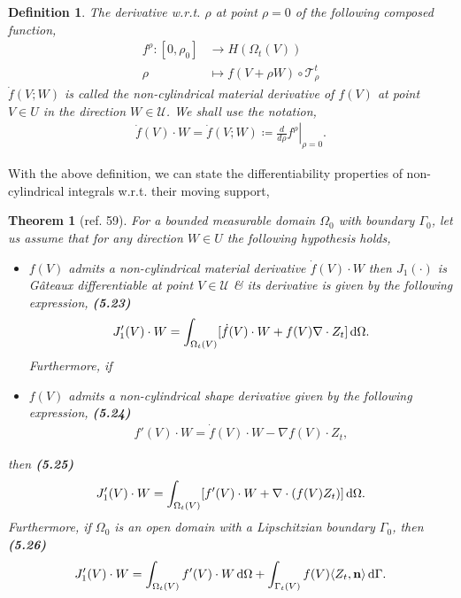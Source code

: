 \documentclass[oneside]{book}
\numberwithin{equation}{section}
\newtheorem{definition}{Definition}[chapter]
\newtheorem{theorem}{Theorem}[chapter]
\begin{document}
\begin{definition}
	The derivative w.r.t. $\rho$ at point $\rho = 0$ of the following composed function,
	\begin{align*}
		f^\rho:[0,\rho_0]&\to H(\Omega_t(V))\\
		\rho&\mapsto f(V + \rho W)\circ\mathcal{T}_\rho^t
	\end{align*}
	$\dot{f}(V;W)$ is called the \emph{non-cylindrical material derivative} of $f(V)$ at point $V\in U$ in the direction $W\in\mathcal{U}$. We shall use the notation,
	\begin{align*}
		\dot{f}(V)\cdot W = \dot{f}(V;W)\coloneqq\left.\frac{d}{d\rho}f^\rho\right|_{\rho = 0}.
	\end{align*}
\end{definition}
With the above definition, we can state the differentiability properties of non-cylindrical integrals w.r.t. their moving support,

\begin{theorem}[ref. 59]
	For a bounded measurable domain $\Omega_0$ with boundary $\Gamma_0$, let us assume that for any direction $W\in U$ the following hypothesis holds,
	\begin{itemize}
		\item[(i)] $f(V)$ admits a non-cylindrical material derivative $\dot{f}(V)\cdot W$ then $J_1(\cdot)$ is G\^ateaux differentiable at point $V\in\mathcal{U}$ \& its derivative is given by the following expression, \textbf{(5.23)}
		\begin{align*}
			J_1'(V)\cdot W = \int_{\Omega_t(V)} [\dot{f}(V)\cdot W + f(V)\nabla\cdot Z_t]\,{\rm d}\Omega.
		\end{align*}
		Furthermore, if
		\item[(ii)] $f(V)$ admits a non-cylindrical shape derivative given by the following expression, \textbf{(5.24)}
		\begin{align*}
			f'(V)\cdot W = \dot{f}(V)\cdot W - \nabla f(V)\cdot Z_t,
		\end{align*}
	\end{itemize}
	then \textbf{(5.25)}
	\begin{align*}
		J_1'(V)\cdot W = \int_{\Omega_t(V)} [f'(V)\cdot W + \nabla\cdot(f(V)Z_t)]\,{\rm d}\Omega.
	\end{align*}
	Furthermore, if $\Omega_0$ is an open domain with a Lipschitzian boundary $\Gamma_0$, then \textbf{(5.26)}
	\begin{align*}
		J_1'(V)\cdot W = \int_{\Omega_t(V)} f'(V)\cdot W\,{\rm d}\Omega + \int_{\Gamma_t(V)} f(V)\langle Z_t,{\bf n}\rangle\,{\rm d}\Gamma.
	\end{align*}
\end{theorem}
\end{document}
